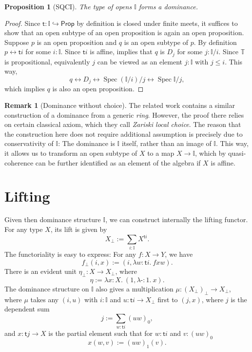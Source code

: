 \documentclass[12pt]{amsart}
\newtheorem{proposition}[theorem]{Proposition}
\theoremstyle{definition}
\newtheorem{remark}[theorem]{Remark}
\newcommand{\mbb}[1]{\mathbb{#1}}
\newcommand{\T}{\mbb T}
\newcommand{\I}{\mbb I}
\newcommand{\ms}[1]{\mathsf{#1}}
\newcommand{\hook}{\hookrightarrow}
\newcommand{\prt}{_{\bot}}
\newcommand{\ld}[2]{\lambda #1\!\colon\!\!#2.\ }
\newcommand{\eq}{\leftrightarrow}
\newcommand{\pp}{\ms{Prop}}
\newcommand{\hp}{\text{-}}
\newcommand{\spec}{\operatorname{Spec}}
\begin{document}
\begin{proposition}[SQCI]\label{prop:Idominance}
  The type of opens $\I$ forms a dominance.
\end{proposition}
\begin{proof}
  Since $\ms t : \I \hook \pp$ by definition is closed under finite meets, it suffices to show that an open subtype of an open proposition is again an open proposition. Suppose $p$ is an open proposition and $q$ is an open subtype of $p$. By definition $p \eq \ms ti$ for some $i:\I$. Since $\ms ti$ is affine,  implies that $q$ is $D_j$ for some $j : \I/i$. Since $\T$ is propositional, equivalently $j$ can be viewed as an element $j : \I$ with $j \le i$. This way, 
  \[ q \eq D_j \eq \spec(\I/i)/j \eq \spec\I/j, \]
  which implies $q$ is also an open proposition.
\end{proof}

\begin{remark}[Dominance without choice]\label{rem:dominancewithoutchoice}
  The related work \cite{Cherubini_Coquand_Hutzler_2024} contains a similar construction of a dominance from a generic \emph{ring}. However, the proof there relies on certain classical axiom, which they call \emph{Zariski local choice}. The reason that the construction here does not require additional assumption is precisely due to conservativity of $\I$: The dominance is $\I$ itself, rather than an image of $\I$. This way, it allows us to transform an open subtype of $X$ to a map $X \to \I$, which by quasi-coherence can be further identified as an element of the algebra if $X$ is affine. 
\end{remark}


\section{Lifting}\label{sec:lifting}

Given then dominance structure $\I$, we can construct internally the lifting functor. For any type $X$, its lift is given by
\[ X\prt := \sum_{i:\I}X^{\ms ti}. \]
The functoriality is easy to express: For any $f : X \to Y$, we have
\[ f\prt(i,x) := (i,\ld{w}{\ms ti}fxw). \]
There is an evident unit $\eta\prt : X \to X\prt$, where
\[ \eta := \ld x X(1,\ld\hp 1 x). \]
The dominance structure on $\I$ also gives a multiplication $\mu : (X\prt)\prt \to X\prt$, where $\mu$ takes any $(i,u)$ with $i : \I$ and $u : \ms ti \to X\prt$ first to $(j,x)$, where $j$ is the dependent sum
\[ j := \sum_{w:\ms ti} (uw)_0, \]
and $x : \ms tj \to X$ is the partial element such that for $w : \ms ti$ and $v : (uw)_0$
\[ x(w,v) := (uw)_1(v). \]
\end{document}
